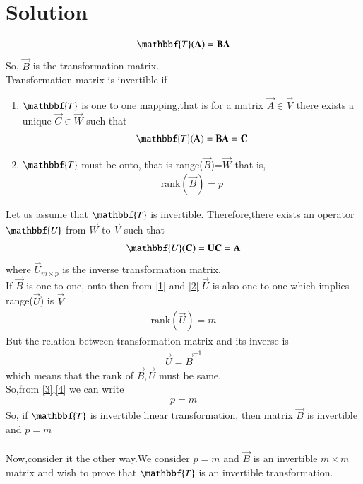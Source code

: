 \documentclass[journal,12pt,twocolumn]{IEEEtran}
\begin{document}
\section{Solution}
\begin{align}
    \mathbbf{T}(\vec{A})=\vec{B}\vec{A}
\end{align}
So, $\vec{B}$ is the transformation matrix.\\
Transformation matrix is invertible if
\begin{enumerate}
    \item $\mathbbf{T}$ is one to one mapping,that is for a matrix $\vec{A} \in \vec{V}$ there exists a unique $\vec{C} \in \vec{W}$ such that
    \begin{align}
        \mathbbf{T}(\vec{A})=\vec{B}\vec{A}=\vec{C} \label{1}
    \end{align}
    \item $\mathbbf{T}$ must be onto, that is range($\vec{B}$)=$\vec{W}$ that is,
    \begin{align}
      \text{rank}(\vec{B}) =p \label{3}
    \end{align}
\end{enumerate}
Let us assume that $\mathbbf{T}$ is invertible. Therefore,there exists an operator $\mathbbf{U}$ from $\vec{W}$ to $\vec{V}$ such that
\begin{align}
    \mathbbf{U}(\vec{C})=\vec{U}\vec{C}=\vec{A} \label{2}
\end{align}
where $\vec{U}_{m \times p}$ is the inverse transformation matrix.\\
If $\vec{B}$ is one to one, onto then from \eqref{1} and \eqref{2} $\vec{U}$ is also one to one which implies range($\vec{U}$) is $\vec{V}$
\begin{align}
    \text{rank}(\vec{U})=m \label{4}
\end{align}
But the relation between transformation matrix and its inverse is
\begin{align}
   \vec{U}=\vec{B}^{-1} 
\end{align}
which means that the rank of $\vec{B},\vec{U}$ must be same.\\
 So,from \eqref{3},\eqref{4} we can write 
\begin{align}
    p=m
\end{align}
So, if $\mathbbf{T}$ is invertible linear transformation, then matrix $\vec{B}$ is invertible and $p=m$
\\
\\
Now,consider it the other way.We consider $p=m$ and $\vec{B}$ is an invertible $m \times m$ matrix and wish to prove that $\mathbbf{T}$ is an invertible transformation.
\end{document}
